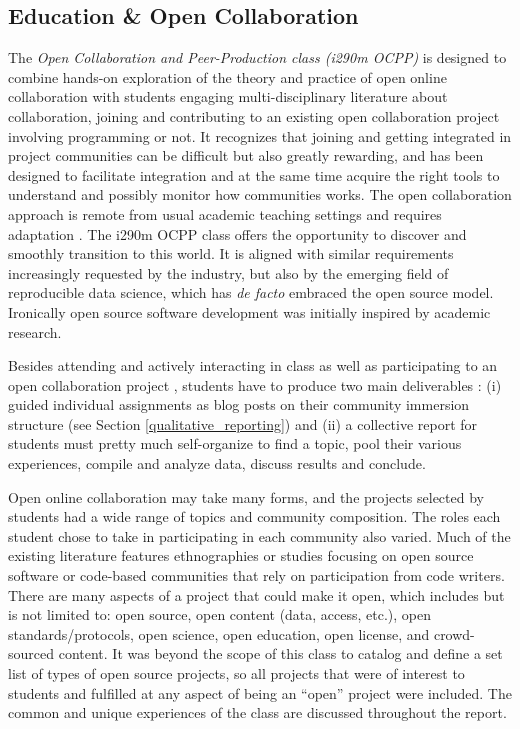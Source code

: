 \subsection{Education \& Open Collaboration}
\label{classmotivations}

The {\it Open Collaboration and Peer-Production class (i290m OCPP)} is designed to combine hands-on exploration of the theory and practice of open online collaboration with students engaging multi-disciplinary literature about collaboration, joining and contributing to an existing open collaboration project involving programming or not. It recognizes that joining and getting integrated in project communities can be difficult but also greatly rewarding, and has been designed to facilitate integration and at the same time acquire the right tools to understand and possibly monitor how communities works. The open collaboration approach is remote from usual academic teaching settings and requires adaptation . The i290m OCPP class offers the opportunity to discover and smoothly transition to this world. It is aligned with similar requirements increasingly requested by the industry, but also by the emerging field of reproducible data science, which has {\it de facto} embraced the open source model. Ironically open source software development  was initially inspired by academic research\cite{bezroukov1999oss}.

Besides attending and actively interacting in class as well as participating to an open collaboration project  \cite{classweb2013}, students have to produce two main deliverables : (i) guided individual assignments as blog posts on their community immersion structure (see Section \ref{qualitative_reporting}) and (ii) a collective report for students must pretty much self-organize to find a topic, pool their various experiences, compile and analyze data, discuss results and conclude. 


Open online collaboration may take many forms, and the projects selected by students had a wide range of topics and community composition. The roles each student chose to take in participating in each community also varied. Much of the existing literature features ethnographies or studies focusing on open source software or code-based communities that rely on participation from code writers. There are many aspects of a project that could make it open, which includes but is not limited to: open source, open content (data, access, etc.), open standards/protocols, open science, open education, open license, and crowd-sourced content. It was beyond the scope of this class to catalog and define a set list of types of open source projects, so all projects that were of interest to students and fulfilled at any aspect of being an “open” project were included. The common and unique experiences of the class are discussed throughout the report.

